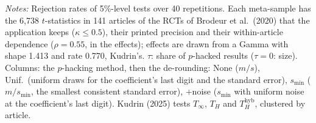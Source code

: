 \begin{table}[htbp]
\par\smallskip
\begin{minipage}{\linewidth}\footnotesize\textit{Notes:} Rejection rates of 5\%-level tests over 40 repetitions. Each meta-sample has the 6{,}738 $t$-statistics in 141 articles of the RCTs of Brodeur et al.\ (2020) that the application keeps ($\kappa \le 0.5$), their printed precision and their within-article dependence ($\rho = 0.55$, in the effects); effects are drawn from a Gamma with shape 1.413 and rate 0.770, Kudrin's. $\tau$: share of $p$-hacked results ($\tau = 0$: size). Columns: the $p$-hacking method, then the de-rounding: None ($m/s$), Unif.\ (uniform draws for the coefficient's last digit and the standard error), $s_{\min}$ ($m/s_{\min}$, the smallest consistent standard error), $+$noise ($s_{\min}$ with uniform noise at the coefficient's last digit). Kudrin (2025) tests $T_\infty$, $T_H$ and $T_H^{\mathrm{hyb}}$, clustered by article.\end{minipage}
\end{table}
